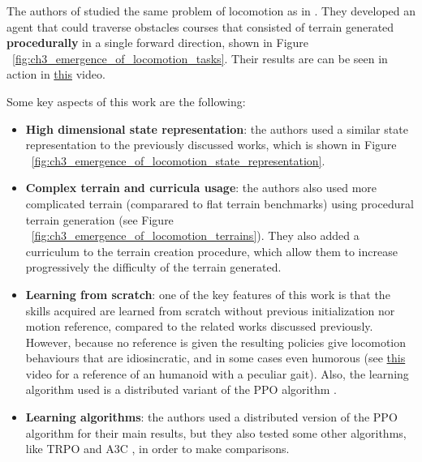 The authors of \cite{DeepmindEmergenceLocomotion} studied the same problem of locomotion
as in \cite{DeepTerrainRL}. They developed an agent that could traverse obstacles
courses that consisted of terrain generated \textbf{procedurally} in a single forward
direction, shown in Figure ~\ref{fig:ch3_emergence_of_locomotion_tasks}. Their results
are can be seen in action in \href{https://youtu.be/hx_bgoTF7bs}{this} video.

\figEmergenceOfLocomotionTasks

Some key aspects of this work are the following:

\begin{itemize}
    \item \textbf{High dimensional state representation}: the authors used a similar
          state representation to the previously discussed works, which is shown in
          Figure ~\ref{fig:ch3_emergence_of_locomotion_state_representation}.

          \figEmergenceOfLocomotionStateRepresentation

    \item \textbf{Complex terrain and curricula usage}: the authors also used more complicated
          terrain (comparared to flat terrain benchmarks) using procedural terrain 
          generation (see Figure ~\ref{fig:ch3_emergence_of_locomotion_terrains}). 
          They also added a curriculum to the terrain creation procedure, which allow them 
          to increase progressively the difficulty of the terrain generated.

          \figEmergenceOfLocomotionTerrain

    \item \textbf{Learning from scratch}: one of the key features of this work is
          that the skills acquired are learned from scratch without previous initialization
          nor motion reference, compared to the related works discussed previously.
          However, because no reference is given the resulting policies give locomotion 
          behaviours that are idiosincratic, and in some cases even humorous (see
          \href{https://youtu.be/hx_bgoTF7bs?t=87}{this} video for a reference of an 
          humanoid with a peculiar gait). Also, the learning algorithm used is a distributed
          variant of the PPO algorithm \citep{PPO}.

    \item \textbf{Learning algorithms}: the authors used a distributed version
          of the PPO \citep{PPO} algorithm for their main results, but they also 
          tested some other algorithms, like TRPO \citep{TRPO} and A3C \citep{A3C}, 
          in order to make comparisons.

\end{itemize}

